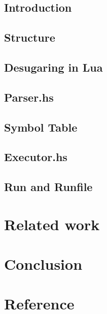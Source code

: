 \documentclass{article}
\begin{document}
\subsection{Introduction}
\subsection{Structure}
\subsection{Desugaring in Lua}
\subsection{Parser.hs}
\subsection{Symbol Table}
\subsection{Executor.hs}
\subsection{Run and Runfile}

\section{Related work}

\section{Conclusion}

\section{Reference}
\end{document}
